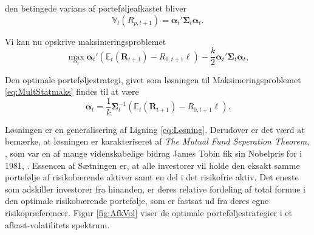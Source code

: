 \documentclass[
  a4paper,
  oneside]{memoir}
\begin{document}
den betingede varians af porteføljeafkastet bliver
\begin{equation}
\mathbb{V}_t(R_{p,t+1})=\bm{\alpha}_t'\bm{\Sigma}_t\bm{\alpha}_t.
\end{equation}

Vi kan nu opskrive maksimeringsproblemet
\begin{equation}
\max_{\alpha_t} \bm{\alpha}_t'(\mathbb{E}_t(\bm{R}_{t+1})- R_{0,t+1}\bm{\ell}) - \frac{k}{2}\bm{\alpha}_t'\bm{\Sigma}_t\bm{\alpha}_t, \label{eq:MultStatmaks}
\end{equation}

Den optimale porteføljestrategi, givet som løsningen til Maksimeringsproblemet \eqref{eq:MultStatmaks} findes til at være
\begin{equation}
\bm{\alpha}_t=\frac{1}{k}\bm{\Sigma}_t^{-1}(\mathbb{E}_t(\bm{R}_{t+1})-R_{0,t+1}\bm{\ell}).\label{eq:Multalpha}
\end{equation}

Løsningen er en generalisering af Ligning \eqref{eq:Løsning}. Derudover er det værd at bemærke, at løsningen er karakteriseret af \textit{The Mutual Fund Seperation Theorem}, \citep{Tobin1958}, som var en af mange videnskabelige bidrag James Tobin fik sin Nobelpris for i 1981, \citep{Nobel2020}. Essencen af Sætningen er, at alle investorer vil holde den eksakt samme portefølje af risikobærende aktiver samt en del i det risikofrie aktiv. Det eneste som adskiller investorer fra hinanden, er deres relative fordeling af total formue i den optimale risikobærende portefølje, som er fastsat ud fra deres egne risikopræferencer. Figur \ref{fig:AfkVol} viser de optimale porteføljestrategier i et afkast-volatilitets spektrum.
\end{document}
